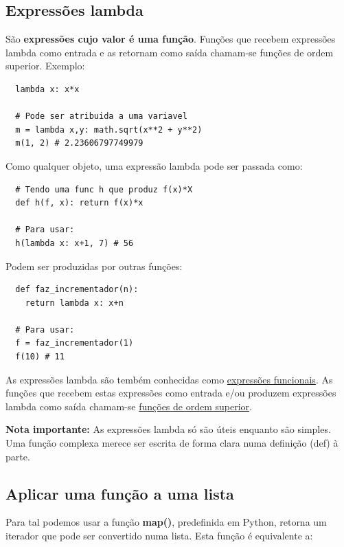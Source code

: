 \documentclass{article}
\begin{document}
\subsection{Expressões lambda}

São \textbf{expressões cujo valor é uma função}. Funções que recebem expressões lambda como
entrada e as retornam como saída chamam-se funções de ordem superior. Exemplo:

\begin{lstlisting}
  lambda x: x*x

  # Pode ser atribuida a uma variavel
  m = lambda x,y: math.sqrt(x**2 + y**2)
  m(1, 2) # 2.23606797749979
\end{lstlisting}

Como qualquer objeto, uma expressão lambda pode ser passada como:

\begin{lstlisting}
  # Tendo uma func h que produz f(x)*X
  def h(f, x): return f(x)*x

  # Para usar:
  h(lambda x: x+1, 7) # 56
\end{lstlisting}

Podem ser produzidas por outras funções:

\begin{lstlisting}
  def faz_incrementador(n):
    return lambda x: x+n

  # Para usar:
  f = faz_incrementador(1)
  f(10) # 11
\end{lstlisting}

As expressões lambda são tembém conhecidas como \uline{expressões funcionais}.
As funções que recebem estas expressões como entrada e/ou produzem expressões
lambda como saída chamam-se \uline{funções de ordem superior}.

\begin{flushleft}
  \textbf{Nota importante:} As expressões lambda só são
  úteis enquanto são simples. Uma função
  complexa merece ser escrita de forma clara
  numa definição (def) à parte.
\end{flushleft}

\pagebreak

\subsection{Aplicar uma função a uma lista}

Para tal podemos usar a função \textbf{map()}, predefinida em Python,
retorna um iterador que pode ser convertido numa lista. Esta função é
equivalente a:
\end{document}
